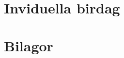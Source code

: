 \documentclass[a4paper,10pt]{report}
\begin{document}


\part{}








\part{Inviduella birdag}
\appendix






\part{Bilagor}
\end{document}
